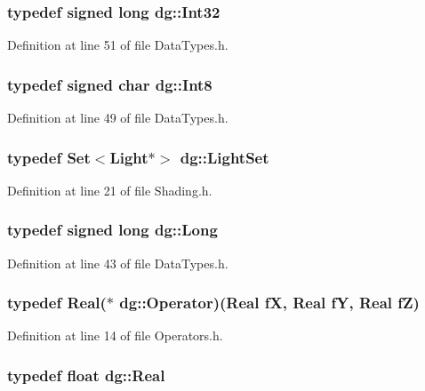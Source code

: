 \subsubsection{\setlength{\rightskip}{0pt plus 5cm}typedef signed long dg::Int32}\label{namespacedg_a22}




Definition at line 51 of file Data\-Types.h.
\subsubsection{\setlength{\rightskip}{0pt plus 5cm}typedef signed char dg::Int8}\label{namespacedg_a20}




Definition at line 49 of file Data\-Types.h.
\subsubsection{\setlength{\rightskip}{0pt plus 5cm}typedef {\bf Set}$<${\bf Light}$\ast$$>$ dg::Light\-Set}\label{namespacedg_a60}




Definition at line 21 of file Shading.h.
\subsubsection{\setlength{\rightskip}{0pt plus 5cm}typedef signed long dg::Long}\label{namespacedg_a16}




Definition at line 43 of file Data\-Types.h.
\subsubsection{\setlength{\rightskip}{0pt plus 5cm}typedef {\bf Real}($\ast$ dg::Operator)({\bf Real} f\-X, {\bf Real} f\-Y, {\bf Real} f\-Z)}\label{namespacedg_a49}




Definition at line 14 of file Operators.h.
\subsubsection{\setlength{\rightskip}{0pt plus 5cm}typedef float dg::Real}\label{namespacedg_a28}




